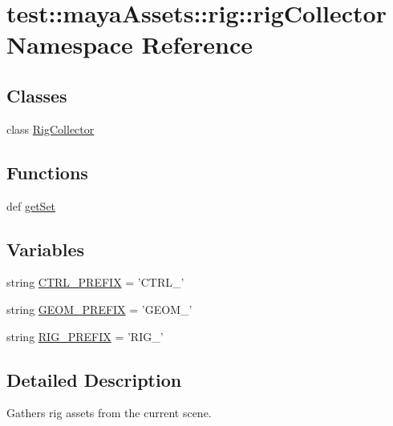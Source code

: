 \hypertarget{namespacetest_1_1mayaAssets_1_1rig_1_1rigCollector}{\section{test\-:\-:maya\-Assets\-:\-:rig\-:\-:rig\-Collector \-Namespace \-Reference}
\label{d4/dba/namespacetest_1_1mayaAssets_1_1rig_1_1rigCollector}
}
\subsection*{\-Classes}
\begin{DoxyCompactItemize}
\item 
class \hyperlink{classtest_1_1mayaAssets_1_1rig_1_1rigCollector_1_1RigCollector}{\-Rig\-Collector}
\end{DoxyCompactItemize}
\subsection*{\-Functions}
\begin{DoxyCompactItemize}
\item 
def \hyperlink{namespacetest_1_1mayaAssets_1_1rig_1_1rigCollector_a249cf36d46fc90e62511382e56bf95e6}{get\-Set}
\end{DoxyCompactItemize}
\subsection*{\-Variables}
\begin{DoxyCompactItemize}
\item 
string \hyperlink{namespacetest_1_1mayaAssets_1_1rig_1_1rigCollector_a33835e94759f8b3e2efb941fded79ffc}{\-C\-T\-R\-L\-\_\-\-P\-R\-E\-F\-I\-X} = '\-C\-T\-R\-L\-\_\-'
\item 
string \hyperlink{namespacetest_1_1mayaAssets_1_1rig_1_1rigCollector_a0ed8db09e77680a1d20685c7461f6246}{\-G\-E\-O\-M\-\_\-\-P\-R\-E\-F\-I\-X} = '\-G\-E\-O\-M\-\_\-'
\item 
string \hyperlink{namespacetest_1_1mayaAssets_1_1rig_1_1rigCollector_a285f1cada0dac3450924a4de63e7b3f3}{\-R\-I\-G\-\_\-\-P\-R\-E\-F\-I\-X} = '\-R\-I\-G\-\_\-'
\end{DoxyCompactItemize}


\subsection{\-Detailed \-Description}
\begin{DoxyVerb}
Gathers rig assets from the current scene.
\end{DoxyVerb}
 

